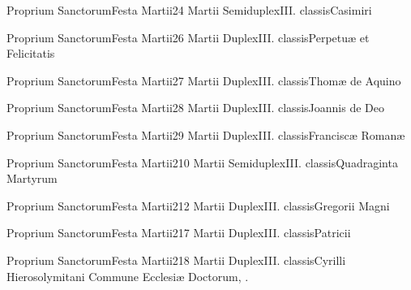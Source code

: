 \documentclass[nocturnale-romanum.tex]{subfiles}
\begin{document}

	{Proprium Sanctorum}{Festa Martii}{2}{4 Martii}
	{Semiduplex}{III. classis}{Casimiri}
	{}
	{}

	{Proprium Sanctorum}{Festa Martii}{2}{6 Martii}
	{Duplex}{III. classis}{Perpetuæ et Felicitatis}
	{}
	{}

	{Proprium Sanctorum}{Festa Martii}{2}{7 Martii}
	{Duplex}{III. classis}{Thomæ de Aquino}
	{}
	{}

	{Proprium Sanctorum}{Festa Martii}{2}{8 Martii}
	{Duplex}{III. classis}{Joannis de Deo}
	{}
	{}

	{Proprium Sanctorum}{Festa Martii}{2}{9 Martii}
	{Duplex}{III. classis}{Franciscæ Romanæ}
	{}
	{}

	{Proprium Sanctorum}{Festa Martii}{2}{10 Martii}
	{Semiduplex}{III. classis}{Quadraginta Martyrum}
	{}
	{}

	{Proprium Sanctorum}{Festa Martii}{2}{12 Martii}
	{Duplex}{III. classis}{Gregorii Magni}
	{}
	{}

	{Proprium Sanctorum}{Festa Martii}{2}{17 Martii}
	{Duplex}{III. classis}{Patricii}
	{}
	{}

	{Proprium Sanctorum}{Festa Martii}{2}{18 Martii}
	{Duplex}{III. classis}{Cyrilli Hierosolymitani}
	{Commune Ecclesiæ Doctorum, \pageref{M-CODO}.}
	{}
\end{document}
